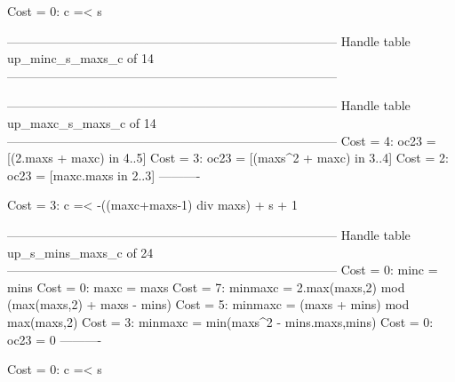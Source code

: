 Cost =  0:  c =< s

--------------------------------------------------------------------------------
Handle table up_minc_s_maxs_c of 14
--------------------------------------------------------------------------------


--------------------------------------------------------------------------------
Handle table up_maxc_s_maxs_c of 14
--------------------------------------------------------------------------------
Cost =  4:  oc23 = [(2.maxs + maxc) in 4..5]
Cost =  3:  oc23 = [(maxs^2 + maxc) in 3..4]
Cost =  2:  oc23 = [maxc.maxs in 2..3]
----------

Cost =  3:  c =< -((maxc+maxs-1) div maxs) + s + 1

--------------------------------------------------------------------------------
Handle table up_s_mins_maxs_c of 24
--------------------------------------------------------------------------------
Cost =  0:  minc    = mins
Cost =  0:  maxc    = maxs
Cost =  7:  minmaxc = 2.max(maxs,2) mod (max(maxs,2) + maxs - mins)
Cost =  5:  minmaxc = (maxs + mins) mod max(maxs,2)
Cost =  3:  minmaxc = min(maxs^2 - mins.maxs,mins)
Cost =  0:  oc23    = 0
----------

Cost =  0:  c =< s
